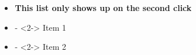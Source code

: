 \documentclass{beamer}
\newcommand{\bit}{\begin{itemize}}
\newcommand{\eit}{\end{itemize}}
\begin{document}
\begin{frame}
\begin{columns}
\begin{column}{0.7\textwidth}
\begin{center}
\begin{footnotesize}
\vspace{-0.1cm}
\end{footnotesize}
\end{center}
\end{column}
\hspace{-1.5cm}
\begin{column}{0.4\textwidth}
\begin{center}
\begin{footnotesize}
\bit
\item<2-> \textbf{This list only shows up on the second click} 
\item[-]<2-> Item 1
\item[-]<2-> Item 2
\eit
\end{footnotesize}
\end{center}
\end{column}
\end{columns}
\end{frame}
\end{document}
